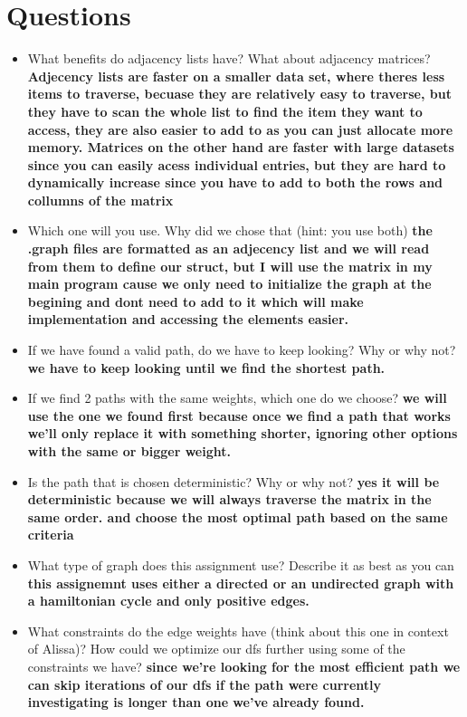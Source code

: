 \documentclass{article}
\begin{document}
\section*{Questions}
\begin{itemize}
    \item What benefits do adjacency lists have? What about adjacency matrices? \textbf{Adjecency lists are faster on a smaller data set, where theres less items to traverse, becuase they are relatively easy to traverse, but they have to scan the whole list to find the item they want to access, they are also easier to add to as you can just allocate more memory. Matrices on the other hand are faster with large datasets since you can easily acess individual entries, but they are hard to dynamically increase since you have to add to both the rows and collumns of the matrix }
    \item Which one will you use. Why did we chose that (hint: you use both) \textbf{ the .graph files are formatted as an adjecency list and we will read from them to define our struct, but I will use the matrix in my main program cause we only need to initialize the graph at the begining and dont need to add to it which will make implementation and accessing the elements easier.}
    \item If we have found a valid path, do we have to keep looking? Why or why not? \textbf{we have to keep looking until we find the shortest path.}
    \item If we find 2 paths with the same weights, which one do we choose? \textbf{we will use the one we found first because once we find a path that works we'll only replace it with something shorter, ignoring other options with the same or bigger weight.}
    \item Is the path that is chosen deterministic? Why or why not? \textbf{yes it will be deterministic because we will always traverse the matrix in the same order. and choose the most optimal path based on the same criteria}
    \item What type of graph does this assignment use? Describe it as best as you can \textbf{this assignemnt uses either a directed or an undirected graph with a hamiltonian cycle and only positive edges.} 
    \item What constraints do the edge weights have (think about this one in context of Alissa)? How could we optimize our dfs further using some of the constraints we have? \textbf{since we're looking for the most efficient path we can skip iterations of our dfs if the path were currently investigating is longer than one we've already found.}
    
\end{itemize}
\end{document}

